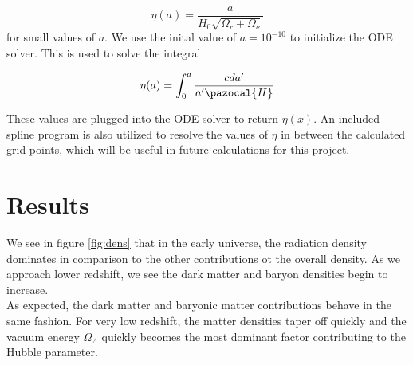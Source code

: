 \documentclass[a4paper]{article}
\begin{document}
\begin{equation}\label{eq:etainit}
\eta(a) = \dfrac{a}{H_0\sqrt{\Omega_r + \Omega_{\nu}}}
\end{equation}
for small values of $a$. We use the inital value of $a = 10^{-10}$ to initialize the ODE solver. This is used to solve the integral

\begin{equation}\label{eq:etaint}
\eta(a) = \int_0^a \dfrac{c da'}{a' \pazocal{H}}
\end{equation}

These values are plugged into the ODE solver to return $\eta(x)$. An included spline program is also utilized to resolve the values of $\eta$ in between the calculated grid points, which will be useful in future calculations for this project. 

\clearpage


\section{Results}\label{Results}

We see in figure \ref{fig:dens} that in the early universe, the radiation density dominates in comparison to the other contributions ot the overall density. As we approach lower redshift, we see the dark matter and baryon densities begin to increase.\\ 

As expected, the dark matter and baryonic matter contributions behave in the same fashion. For very low redshift, the matter densities taper off quickly and the vacuum energy $\Omega_{\Lambda}$ quickly becomes the most dominant factor contributing to the Hubble parameter.
\end{document}
